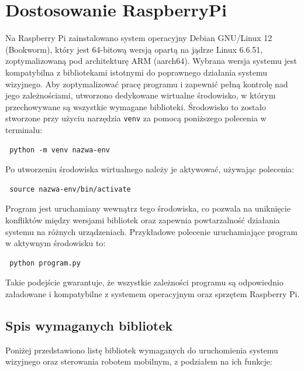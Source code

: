 \documentclass[a4paper,twoside,12pt]{book}
\begin{document}
\newpage

\section{Dostosowanie RaspberryPi}
Na Raspberry Pi zainstalowano system operacyjny Debian GNU/Linux 12 (Bookworm), który jest 64-bitową wersją opartą na jądrze Linux 6.6.51, zoptymalizowaną pod architekturę ARM (aarch64). Wybrana wersja systemu jest kompatybilna z bibliotekami istotnymi do poprawnego działania systemu wizyjnego. Aby zoptymalizować pracę programu i zapewnić pełną kontrolę nad jego zależnościami, utworzono dedykowane wirtualne środowisko, w którym przechowywane są wszystkie wymagane biblioteki. Środowisko to zostało stworzone przy użyciu narzędzia \texttt{venv} za pomocą poniższego polecenia w terminalu: \begin{verbatim} python -m venv nazwa-env \end{verbatim} Po utworzeniu środowiska wirtualnego należy je aktywować, używając polecenia: \begin{verbatim} source nazwa-env/bin/activate \end{verbatim} Program jest uruchamiany wewnątrz tego środowiska, co pozwala na uniknięcie konfliktów między wersjami bibliotek oraz zapewnia powtarzalność działania systemu na różnych urządzeniach. Przykładowe polecenie uruchamiające program w aktywnym środowisku to: \begin{verbatim} python program.py \end{verbatim} Takie podejście gwarantuje, że wszystkie zależności programu są odpowiednio załadowane i kompatybilne z systemem operacyjnym oraz sprzętem Raspberry Pi.
\newpage
\subsection{Spis wymaganych bibliotek}
Poniżej przedstawiono listę bibliotek wymaganych do uruchomienia systemu wizyjnego oraz sterowania robotem mobilnym, z podziałem na ich funkcje:
\end{document}
